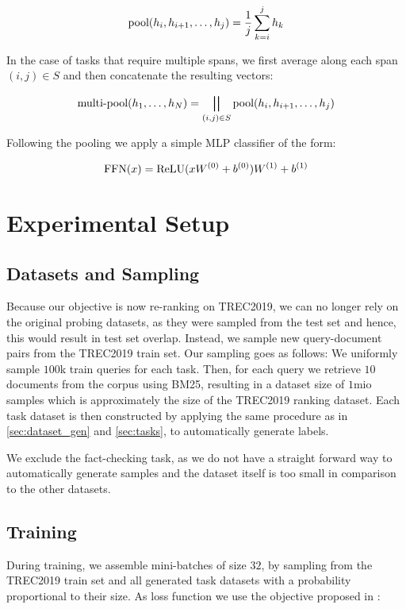 \begin{equation}
    \text{pool}(h_i, h_{i+1},\dots, h_j)= \frac{1}{j} \sum_{k=i}^j h_k
\end{equation}

In the case of tasks that require multiple spans, we first average along each span $(i,j) \in S$ and then concatenate the resulting vectors:

\begin{equation}
    \text{multi-pool}(h_1, \dots, h_N) = \bigparallel_{(i, j) \in S}{\text{pool}(h_i, h_{i+1},\dots, h_j)}
\end{equation}

Following the pooling we apply a simple MLP classifier of the form:

\begin{equation}
    \text{FFN}(x) = \text{ReLU}(x W^{(0)} + b^{(0)}) W^{(1)} + b^{(1)}
\end{equation}


\section{Experimental Setup}
\subsection{Datasets and Sampling}
Because our objective is now re-ranking on TREC2019, we can no longer rely on the original probing datasets, as they were sampled from the test set and hence, this would result in test set overlap. Instead, we sample new query-document pairs from the TREC2019 train set. Our sampling goes as follows: We uniformly sample $100$k train queries for each task. Then, for each query we retrieve $10$ documents from the corpus using BM25, resulting in a dataset size of $1$mio samples which is approximately the size of the TREC2019 ranking dataset. Each task dataset is then constructed by applying the same procedure as in \autoref{sec:dataset_gen} and \autoref{sec:tasks}, to automatically generate labels.

We exclude the fact-checking task, as we do not have a straight forward way to automatically generate samples and the dataset itself is too small in comparison to the other datasets.

\subsection{Training}
During training, we assemble mini-batches of size $32$, by sampling from the TREC2019 train set and all generated task datasets with a probability proportional to their size. As loss function we use the objective proposed in \cite{aghajanyan-etal-2021-muppet}:

